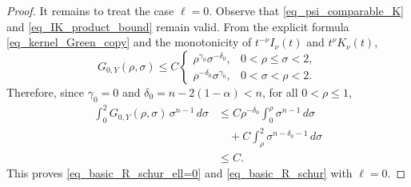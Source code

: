 \documentclass[12pt]{amsart}
\begin{document}
\begin{proof}
It remains to treat the case $\ell=0$. Observe that \eqref{eq_psi_comparable_K} and \eqref{eq_IK_product_bound} remain valid. From the explicit formula \eqref{eq_kernel_Green_copy} and the monotonicity of $t^{-\nu}I_{\nu}(t)$ and $t^\nu K_\nu(t)$,
\begin{equation*}
    G_{0,Y}(\rho,\sigma) \le C \begin{cases}
        \rho^{\gamma_0} \sigma^{-\delta_0}, & 0<\rho \le \sigma <2,\\[4pt]
        \rho^{-\delta_0} \sigma^{\gamma_0}, & 0<\sigma <\rho<2.
    \end{cases}
\end{equation*}
Therefore, since $\gamma_0 = 0$ and $\delta_0 = n-2(1-\alpha) <n$, for all $0<\rho \le 1$,
\begin{align*}
    \int_0^2 G_{0,Y}(\rho,\sigma)\,\sigma^{n-1}\,d\sigma
    &\le C \rho^{-\delta_0} \int_0^\rho \sigma^{n-1}\,d\sigma\\
    &\quad+ C \int_\rho^2 \sigma^{n-\delta_0 -1}\,d\sigma \\
    &\le C.
\end{align*}
This proves \eqref{eq_basic_R_schur_ell=0} and \eqref{eq_basic_R_schur} with $\ell=0$.





\end{proof}
\end{document}
